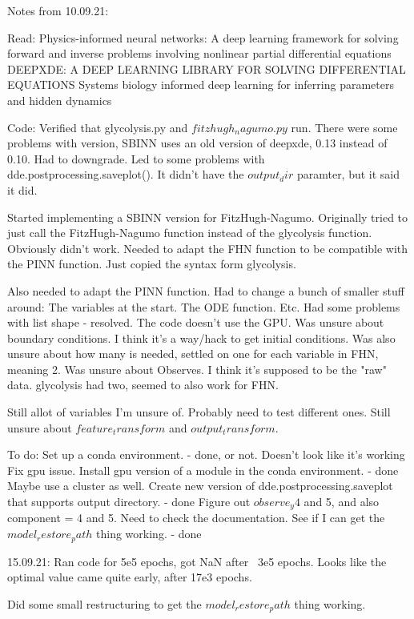 
Notes from 10.09.21:

Read:
    Physics-informed  neural  networks:  A  deep  learning framework  for  solving  forward  and  inverse  problems  involving nonlinear  partial  differential  equations
    DEEPXDE: A DEEP LEARNING LIBRARY FOR SOLVING DIFFERENTIAL EQUATIONS
    Systems biology informed deep learning for inferring parameters and hidden dynamics

Code:
Verified that glycolysis.py and $fitzhugh_nagumo.py$ run.
There were some problems with version, SBINN uses an old version of deepxde, 0.13 instead of 0.10. Had to downgrade.
Led to some problems with dde.postprocessing.saveplot(). It didn't have the $output_dir$ paramter, but it said it did.

Started implementing a SBINN version for FitzHugh-Nagumo. 
Originally tried to just call the FitzHugh-Nagumo function instead of the glycolysis function. Obviously didn't work. 
Needed to adapt the FHN function to be compatible with the PINN function. Just copied the syntax form glycolysis.

Also needed to adapt the PINN function. Had to change a bunch of smaller stuff around:
    The variables at the start.
    The ODE function.
    Etc.
Had some problems with list shape - resolved.
The code doesn't use the GPU.
Was unsure about boundary conditions. I think it's a way/hack to get initial conditions. Was also unsure about how many is needed, settled on one for each variable in FHN, meaning 2. 
Was unsure about Observes. I think it's supposed to be the "raw" data. glycolysis had two, seemed to also work for FHN. 

Still allot of variables I'm unsure of. Probably need to test different ones. 
Still unsure about $feature_transform$ and $output_transform$.


To do:
Set up a conda environment. - done, or not. Doesn't look like it's working 
Fix gpu issue. Install gpu version of a module in the conda environment. - done
Maybe use a cluster as well. 
Create new version of dde.postprocessing.saveplot that supports output directory. - done
Figure out $observe_y4$ and 5, and also component = 4 and 5. Need to check the documentation. 
See if I can get the $model_restore_path$ thing working. - done




15.09.21:
Ran code for 5e5 epochs, got NaN after ~3e5 epochs.
Looks like the optimal value came quite early, after 17e3 epochs.

Did some small restructuring to get the $model_restore_path$ thing working.

